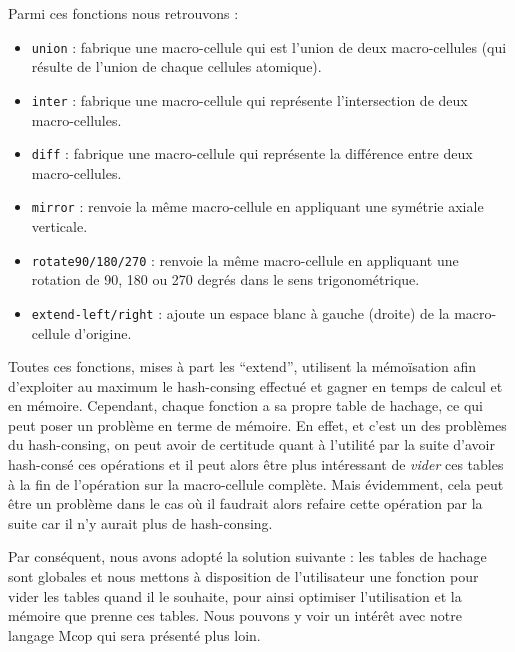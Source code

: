 \documentclass[a4paper,12pt]{report}
\begin{document}
Parmi ces fonctions nous retrouvons :
\begin{itemize}
\item \texttt{union} : fabrique une macro-cellule qui est l'union de deux
  macro-cellules (qui résulte de l'union de chaque cellules atomique).
\item \texttt{inter} : fabrique une macro-cellule qui représente l'intersection
  de deux macro-cellules.
\item \texttt{diff} : fabrique une macro-cellule qui représente la différence
  entre deux macro-cellules.
\item \texttt{mirror} : renvoie la même macro-cellule en appliquant une
  symétrie axiale verticale.
\item \texttt{rotate90/180/270} : renvoie la même macro-cellule en appliquant
  une rotation de 90, 180 ou 270 degrés dans le sens trigonométrique.
\item \texttt{extend-left/right} : ajoute un espace blanc à gauche (droite) de
  la macro-cellule d'origine.
\end{itemize}

Toutes ces fonctions, mises à part les ``extend'', utilisent la
mémoïsation afin d'exploiter au maximum le hash-consing effectué et
gagner en temps de calcul et en mémoire. Cependant, chaque fonction a
sa propre table de hachage, ce qui peut poser un problème en terme de
mémoire. En effet, et c'est un des problèmes du hash-consing, on peut avoir de
certitude quant à l'utilité par la suite d'avoir hash-consé ces opérations et il
peut alors être plus intéressant de \textit{vider} ces tables à la fin de
l'opération sur la macro-cellule complète. Mais évidemment, cela peut être un
problème dans le cas où il faudrait alors refaire cette opération par la suite
car il n'y aurait plus de hash-consing.

\medskip

Par conséquent, nous avons adopté la solution suivante : les tables de
hachage sont globales et nous mettons à disposition de l'utilisateur
une fonction pour vider les tables quand il le souhaite, pour ainsi
optimiser l'utilisation et la mémoire que prenne ces tables. Nous
pouvons y voir un intérêt avec notre langage Mcop qui sera présenté
plus loin.
\end{document}
